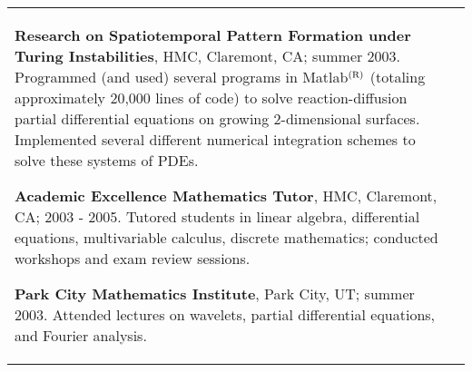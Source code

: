 \documentclass{article}
\begin{document}
\begin{center}
\begin{tabular}{@{}p{\CWa\columnwidth}@{}p{\CWb\columnwidth}@{}}
\begin{minipage}[t]{\CWb\columnwidth}
\vspace{\VSEX}
\par \textbf{Research on Spatiotemporal Pattern Formation under Turing Instabilities}, HMC, Claremont, CA; summer 2003.  Programmed (and used) several programs in Matlab$^{\rm (R)}$ (totaling approximately 20,000 lines of code) to solve reaction-diffusion partial differential equations on growing 2-dimensional surfaces.  Implemented several different numerical integration schemes to solve these systems of PDEs.
\vspace{\VSEX}
\par \textbf{Academic Excellence Mathematics Tutor}, HMC, Claremont, CA; 2003 - 2005.  Tutored students in linear algebra, differential equations, multivariable calculus, discrete mathematics; conducted workshops and exam review sessions.
\par \textbf{Park City Mathematics Institute}, Park City, UT; summer 2003.  Attended lectures on wavelets, partial differential equations, and Fourier analysis.
\end{minipage}
\end{tabular}

\vspace{\VS}


\end{center}
\end{document}
